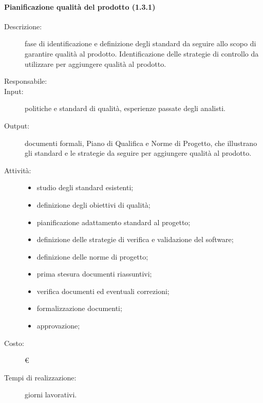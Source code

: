 \paragraph{Pianificazione qualità del prodotto (1.3.1)}
\begin{description}
\item[Descrizione:] fase di identificazione e definizione degli standard da seguire allo scopo di garantire qualità al prodotto. Identificazione delle strategie di controllo da utilizzare per aggiungere qualità al prodotto.
\item[Responsabile:] 
\item[Input:] politiche e standard di qualità, esperienze passate degli analisti.
\item[Output:] documenti formali, Piano di Qualifica e Norme di Progetto, che illustrano gli standard e le strategie da seguire per aggiungere qualità al prodotto.
\item[Attività:]
\begin{itemize}
\item studio degli standard esistenti;
\item definizione degli obiettivi di qualità;
\item pianificazione adattamento standard al progetto;
\item definizione delle strategie di verifica e validazione del software;
\item definizione delle norme di progetto;
\item prima stesura documenti riassuntivi;
\item verifica documenti ed eventuali correzioni;
\item formalizzazione documenti;
\item approvazione;
\end{itemize}
\item[Costo:] \euro{}
\item[Tempi di realizzazione:]  giorni lavorativi.
\end{description}


